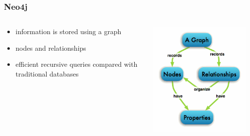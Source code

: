 \documentclass{beamer}
\begin{document}
\begin{frame}
	\frametitle{Neo4j}
	
	
	
\begin{columns} 
\begin{column}{0.60 \textwidth}
		\begin{itemize}
		\item information is stored using a graph
		\item nodes and relationships
		\item efficient recursive queries compared with traditional databases
		\end{itemize}
		\end{column}
		\begin{column}{0.40\textwidth}
   \includegraphics[width=0.95\textwidth]{graphdb-neo4j.png}
       \\
  \end{column}
  \end{columns}

\end{frame}
\end{document}
